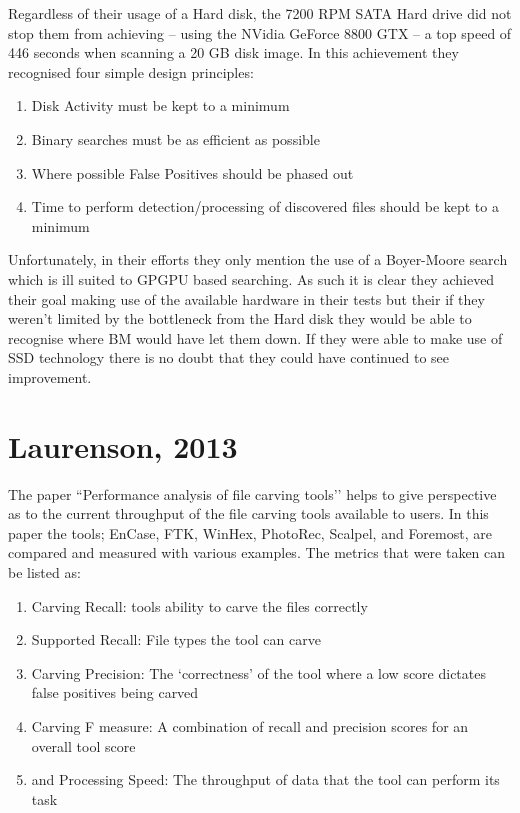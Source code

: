 Regardless of their usage of a Hard disk, the 7200 RPM SATA Hard drive did not stop them from achieving -- using the NVidia GeForce 8800 GTX -- a top speed of 446 seconds when scanning a 20 GB disk image.
In this achievement they recognised four simple design principles:\\
\begin{enumerate}[noitemsep, topsep=0pt]
    \item Disk Activity must be kept to a minimum
    \item Binary searches must be as efficient as possible
    \item Where possible False Positives should be phased out
    \item Time to perform detection/processing of discovered files should be kept to a\\minimum
\end{enumerate}

Unfortunately, in their efforts they only mention the use of a Boyer-Moore search which is ill suited to \ac{GPGPU} based searching.
As such it is clear they achieved their goal making use of the available hardware in their tests but their if they weren’t limited by the bottleneck from the Hard disk they would be able to recognise where \ac{BM} would have let them down.
If they were able to make use of \ac{SSD} technology there is no doubt that they could have continued to see improvement.
\newline
\newline
\newline
\section*{Laurenson, 2013}
The paper ``Performance analysis of file carving tools’’ helps to give perspective as to the current throughput of the file carving tools available to users.
In this paper the tools; EnCase, FTK, WinHex, PhotoRec, Scalpel, and Foremost, are compared and measured with various examples.
The metrics that were taken can be listed as:
\begin{enumerate}[noitemsep, topsep=0pt]
    \item Carving Recall: tools ability to carve the files correctly
    \item Supported Recall: File types the tool can carve
    \item Carving Precision: The `correctness’ of the tool where a low score dictates false positives being carved
    \item Carving F measure: A combination of recall and precision scores for an overall tool score
    \item and Processing Speed: The throughput of data that the tool can perform its task
\end{enumerate}

